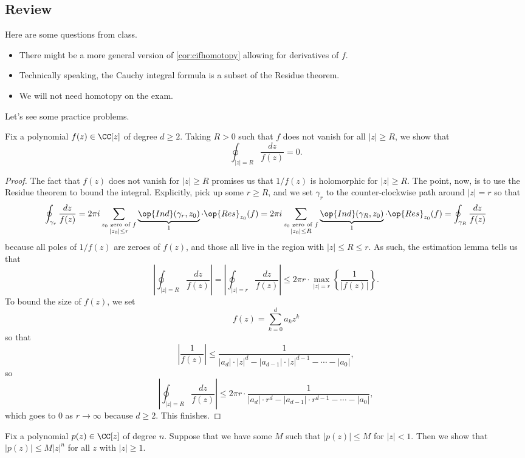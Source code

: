 \documentclass[../notes.tex]{subfiles}
\begin{document}
\subsection{Review}
Here are some questions from class.
\begin{itemize}
	\item There might be a more general version of \autoref{cor:cifhomotopy} allowing for derivatives of $f$.
	\item Technically speaking, the Cauchy integral formula is a subset of the Residue theorem.
	\item We will not need homotopy on the exam.
\end{itemize}
Let's see some practice problems.
\begin{exe}
	Fix a polynomial $f(z)\in\CC[z]$ of degree $d\ge2$. Taking $R>0$ such that $f$ does not vanish for all $|z|\ge R$, we show that
	\[\oint_{|z|=R}\frac{dz}{f(z)}=0.\]
\end{exe}
\begin{proof}
	The fact that $f(z)$ does not vanish for $|z|\ge R$ promises us that $1/f(z)$ is holomorphic for $|z|\ge R$. The point, now, is to use the Residue theorem to bound the integral. Explicitly, pick up some $r\ge R$, and we set $\gamma_r$ to the counter-clockwise path around $|z|=r$ so that
	\[\oint_{\gamma_r}\frac{dz}{f(z)}=2\pi i\sum_{\substack{z_0\text{ zero of }f\\|z_0|\le r}}\underbrace{\op{Ind}(\gamma_r,z_0)}_1\cdot\op{Res}_{z_0}(f)=2\pi i\sum_{\substack{z_0\text{ zero of }f\\|z_0|\le R}}\underbrace{\op{Ind}(\gamma_R,z_0)}_1\cdot\op{Res}_{z_0}(f)=\oint_{\gamma_R}\frac{dz}{f(z)}\]
	because all poles of $1/f(z)$ are zeroes of $f(z)$, and those all live in the region with $|z|\le R\le r$. As such, the estimation lemma tells us that
	\[\left|\oint_{|z|=R}\frac{dz}{f(z)}\right|=\left|\oint_{|z|=r}\frac{dz}{f(z)}\right|\le2\pi r\cdot\max_{|z|=r}\left\{\frac1{|f(z)|}\right\}.\]
	To bound the size of $f(z)$, we set
	\[f(z)=\sum_{k=0}^da_kz^k\]
	so that
	\[\left|\frac1{f(z)}\right|\le\frac1{|a_d|\cdot |z|^d-|a_{d-1}|\cdot|z|^{d-1}-\cdots-|a_0|},\]
	so
	\[\left|\oint_{|z|=R}\frac{dz}{f(z)}\right|\le2\pi r\cdot\frac1{|a_d|\cdot r^d-|a_{d-1}|\cdot r^{d-1}-\cdots-|a_0|},\]
	which goes to $0$ as $r\to\infty$ because $d\ge2$. This finishes.
\end{proof}
\begin{exe}
	Fix a polynomial $p(z)\in\CC[z]$ of degree $n$. Suppose that we have some $M$ such that $|p(z)|\le M$ for $|z|<1$. Then we show that $|p(z)|\le M|z|^n$ for all $z$ with $|z|\ge1$.
\end{exe}
\end{document}
